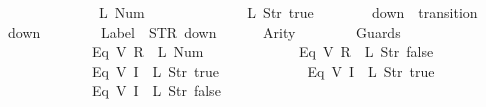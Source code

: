\begin{isabellebody}
\ \ \ \ \ \ \ \ \ \ \ \ {\isacharparenleft}{}{\isacharcomma}\ {\isacharparenleft}L\ {\isacharparenleft}Num\ {}{\isacharparenright}{\isacharparenright}{\isacharparenright}{\isacharcomma}\isanewline
\ \ \ \ \ \ \ \ \ \ \ \ {\isacharparenleft}{}{\isacharcomma}\ {\isacharparenleft}L\ {\isacharparenleft}Str\ {\isacharprime}{\isacharprime}true{\isacharprime}{\isacharprime}{\isacharparenright}{\isacharparenright}{\isacharparenright}\isanewline
\ \ \ \ \ \ {\isacharbrackright}\isanewline
{\isasymrparr}{\isachardoublequoteclose}\isanewline
\isanewline
{}\isamarkupfalse%
\ {\isachardoublequoteopen}down{}{}{\isachardoublequoteclose}\ {\isacharcolon}{\isacharcolon}\ {\isachardoublequoteopen}transition{\isachardoublequoteclose}\ \isanewline
{\isachardoublequoteopen}down{}{}\ {\isasymequiv}\ {\isasymlparr}\isanewline
\ \ \ \ \ \ Label\ {\isacharequal}\ STR\ {\isacharprime}{\isacharprime}down{\isacharprime}{\isacharprime}{\isacharcomma}\isanewline
\ \ \ \ \ \ Arity\ {\isacharequal}\ {}{\isacharcomma}\isanewline
\ \ \ \ \ \ Guards\ {\isacharequal}\ {\isacharbrackleft}\isanewline
\ \ \ \ \ \ \ \ \ \ \ \ {\isacharparenleft}Eq\ {\isacharparenleft}V\ {\isacharparenleft}R\ {}{\isacharparenright}{\isacharparenright}\ {\isacharparenleft}L\ {\isacharparenleft}Num\ {}{\isacharparenright}{\isacharparenright}{\isacharparenright}{\isacharcomma}\isanewline
\ \ \ \ \ \ \ \ \ \ \ \ {\isacharparenleft}Eq\ {\isacharparenleft}V\ {\isacharparenleft}R\ {}{\isacharparenright}{\isacharparenright}\ {\isacharparenleft}L\ {\isacharparenleft}Str\ {\isacharprime}{\isacharprime}false{\isacharprime}{\isacharprime}{\isacharparenright}{\isacharparenright}{\isacharparenright}{\isacharcomma}\isanewline
\ \ \ \ \ \ \ \ \ \ \ \ {\isacharparenleft}Eq\ {\isacharparenleft}V\ {\isacharparenleft}I\ {}{\isacharparenright}{\isacharparenright}\ {\isacharparenleft}L\ {\isacharparenleft}Str\ {\isacharprime}{\isacharprime}true{\isacharprime}{\isacharprime}{\isacharparenright}{\isacharparenright}{\isacharparenright}{\isacharcomma}\isanewline
\ \ \ \ \ \ \ \ \ \ \ \ {\isacharparenleft}Eq\ {\isacharparenleft}V\ {\isacharparenleft}I\ {}{\isacharparenright}{\isacharparenright}\ {\isacharparenleft}L\ {\isacharparenleft}Str\ {\isacharprime}{\isacharprime}true{\isacharprime}{\isacharprime}{\isacharparenright}{\isacharparenright}{\isacharparenright}{\isacharcomma}\isanewline
\ \ \ \ \ \ \ \ \ \ \ \ {\isacharparenleft}Eq\ {\isacharparenleft}V\ {\isacharparenleft}I\ {}{\isacharparenright}{\isacharparenright}\ {\isacharparenleft}L\ {\isacharparenleft}Str\ {\isacharprime}{\isacharprime}false{\isacharprime}{\isacharprime}{\isacharparenright}{\isacharparenright}{\isacharparenright}\isanewline

\end{isabellebody}
